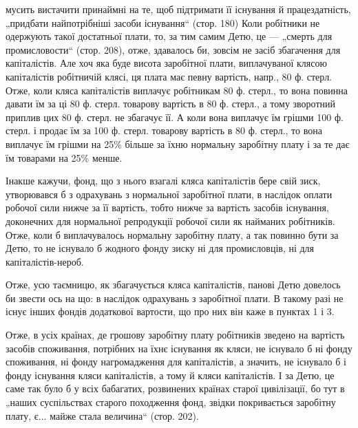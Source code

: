 \parcont{}  %
мусить вистачити принаймні на те, щоб підтримати її існування й
працездатність, „придбати найпотрібніші засоби існування“ (стор. 180)
Коли робітники не одержують такої достатньої плати, то, за тим самим
Детю, це — „смерть для промисловости“ (стор. 208), отже, здавалось би,
зовсім не засіб збагачення для капіталістів. Але хоч яка буде висота заробітної
плати, виплачуваної клясою капіталістів робітничій клясі, ця плата
має певну вартість, напр., 80 ф. стерл. Отже, коли кляса капіталістів
виплачує робітникам 80 ф. стерл., то вона повинна давати їм за ці 80 ф.
стерл. товарову вартість в 80 ф. стерл., а тому зворотний приплив цих
80 ф. стерл. не збагачує її. А коли вона виплачує їм грішми 100 ф. стерл.
і продає їм за 100 ф. стерл. товарову вартість в 80 ф. стерл., то вона
виплачує їм грішми на 25\% більше за їхню нормальну заробітну плату
і за те дає їм товарами на 25\% менше.

Інакше кажучи, фонд, що з нього взагалі кляса капіталістів бере свій
зиск, утворювався б з одрахувань з нормальної заробітної плати, в наслідок
оплати робочої сили нижче за її вартість, тобто нижче за вартість засобів
існування, доконечних для нормальної репродукції робочої сили як
найманих робітників. Отже, коли б виплачувалось нормальну заробітну
плату, а так повинно бути за Детю, то не існувало б жодного фонду
зиску ні для промисловців, ні для капіталістів-нероб.

Отже, усю таємницю, як збагачується кляса капіталістів, панові Детю
довелось би звести ось на що: в наслідок одрахувань з заробітної плати.
В такому разі не існує інших фондів додаткової вартости, що про них
він каже в пунктах 1 і 3.

Отже, в усіх країнах, де грошову заробітну плату робітників зведено
на вартість засобів споживання, потрібних на їхнє існування як кляси,
не існувало б ні фонду споживання, ні фонду нагромадження для капіталістів,
а значить, не існувало б і фонду існування кляси капіталістів, а
тому й кляси капіталістів. І за Детю, це саме так було б у всіх бабагатих,
розвинених країнах старої цивілізації, бо тут в „наших суспільствах
старого походження фонд, звідки покривається заробітну плату,
є... майже стала величина“ (стор. 202).

